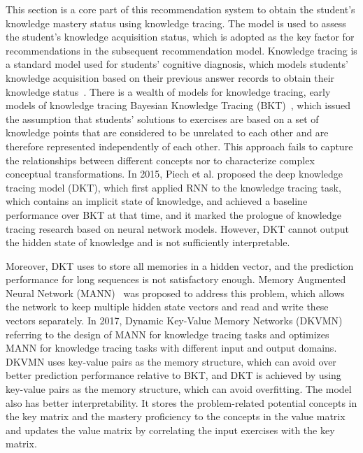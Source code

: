 This section is a core part of this recommendation system to obtain the student's knowledge mastery status using knowledge tracing. The model is used to assess the student's knowledge acquisition status, which is adopted as the key factor for recommendations in the subsequent recommendation model. Knowledge tracing is a standard model used for students' cognitive diagnosis, which models students' knowledge acquisition based on their previous answer records to obtain their knowledge status~\cite{gonzalez2014general}. There is a wealth of models for knowledge tracing, early models of knowledge tracing Bayesian Knowledge Tracing (BKT)~\cite{yudelson2013individualized}, which issued the assumption that students' solutions to exercises are based on a set of knowledge points that are considered to be unrelated to each other and are therefore represented independently of each other. This approach fails to capture the relationships between different concepts nor to characterize complex conceptual transformations. In 2015, Piech et al. proposed the deep knowledge tracing model (DKT), which first applied RNN to the knowledge tracing task, which contains an implicit state of knowledge, and achieved a baseline performance over BKT at that time, and it marked the prologue of knowledge tracing research based on neural network models. However, DKT cannot output the hidden state of knowledge and is not sufficiently interpretable.

Moreover, DKT uses to store all memories in a hidden vector, and the prediction performance for long sequences is not satisfactory enough. Memory Augmented Neural Network (MANN)~\cite{santoro2016meta} was proposed to address this problem, which allows the network to keep multiple hidden state vectors and read and write these vectors separately. In 2017, Dynamic Key-Value Memory Networks (DKVMN)~\cite{zhang2017dynamic} referring to the design of MANN for knowledge tracing tasks and optimizes MANN for knowledge tracing tasks with different input and output domains. DKVMN uses key-value pairs as the memory structure, which can avoid over better prediction performance relative to BKT, and DKT is achieved by using key-value pairs as the memory structure, which can avoid overfitting. The model also has better interpretability. It stores the problem-related potential concepts in the key matrix and the mastery proficiency to the concepts in the value matrix and updates the value matrix by correlating the input exercises with the key matrix.

